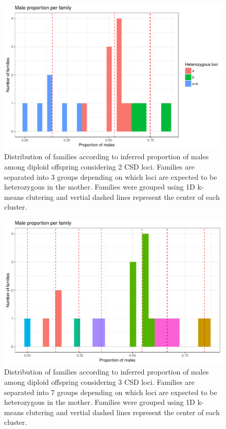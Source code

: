 \documentclass[10pt,a4paper]{report}
\begin{document}
\begin{figure}[h]
	\begin{center}
		\includegraphics[width=1\textwidth]{Num_CSD_loci/Group_mother_21fam_3gr.pdf}
		\caption{Distribution of families according to inferred proportion of males among diploid offspring considering 2 CSD loci. Families are separated into 3 groups depending on which loci are expected to be heterozygous in the mother. Families were grouped using 1D k-means clutering and vertial dashed lines represent the center of each cluster.}
		\label{cat_2L_21F}
	\end{center}
\end{figure}

\begin{figure}[h]
	\begin{center}
		\includegraphics[width=1\textwidth]{Num_CSD_loci/Group_mother_21fam_7gr.pdf}
		\caption{Distribution of families according to inferred proportion of males among diploid offspring considering 3 CSD loci. Families are separated into 7 groups depending on which loci are expected to be heterozygous in the mother. Families were grouped using 1D k-means clutering and vertial dashed lines represent the center of each cluster.}
		\label{cat_3L_21F}
	\end{center}
\end{figure}
\end{document}
